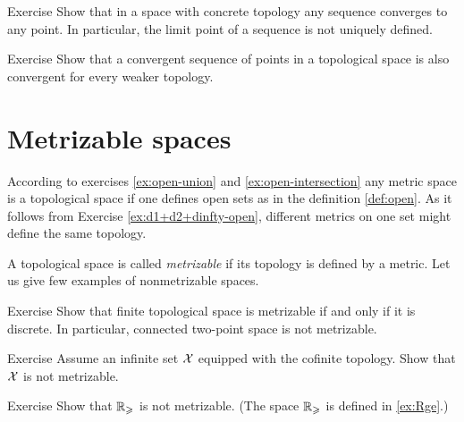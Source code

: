 \begin{thm}{Exercise}
Show that in a space with concrete topology any sequence converges to any point.
In particular, the limit point of a sequence is not uniquely defined.
\end{thm}

\begin{thm}{Exercise}
Show that a convergent sequence of points in a topological space is also convergent for every weaker topology.
\end{thm}


\section{Metrizable spaces}

According to exercises \ref{ex:open-union} and \ref{ex:open-intersection} any metric space is a topological space if one defines open sets as in the definition \ref{def:open}.
As it follows from Exercise \ref{ex:d1+d2+dinfty-open},
different metrics on one set might define the same topology.

A topological space is called \emph{metrizable} if its topology is defined by a metric.
Let us give few examples of nonmetrizable spaces.

\begin{thm}{Exercise}\label{ex:finite+metrizable}
Show that finite topological space is metrizable if and only if it is discrete.
In particular, connected two-point space is not metrizable.
\end{thm}

\begin{thm}{Exercise}
Assume an infinite set $\mathcal{X}$ equipped with the cofinite topology.
Show that $\mathcal{X}$ is not metrizable.
\end{thm}

\begin{thm}{Exercise}
Show that $\mathbb{R}_\geqslant$ is not metrizable.
(The space $\mathbb{R}_\geqslant$ is defined in \ref{ex:Rge}.)
\end{thm}
